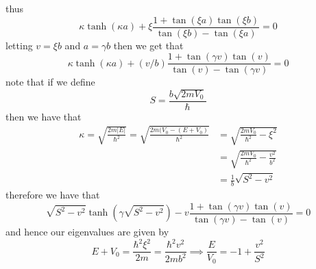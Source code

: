 \documentclass[12pt]{report}
\begin{document}
thus
\begin{equation*}
\kappa \tanh(\kappa a) + \xi \frac{1 + \tan(\xi a)\tan(\xi b)}{\tan(\xi b) - \tan(\xi a)} = 0
\end{equation*}
letting $v = \xi b$ and $a = \gamma b$ then we get that
\begin{equation*}
    \kappa \tanh(\kappa a) + (v/b) \frac{1 + \tan(\gamma v)\tan(v)}{\tan(v) - \tan(\gamma v)} = 0
\end{equation*}
note that if we define
\begin{equation*}
    S = \frac{b\sqrt{2mV_0}}{\hbar}
\end{equation*}
then we have that
\begin{align*}
    \kappa = \sqrt{\frac{2m|E|}{\hbar^2}} =\sqrt{\frac{2m(V_0 - (E + V_0)}{\hbar^2}} &= \sqrt{\frac{2mV_0}{\hbar^2} -\xi^2} \\
    &= \sqrt{\frac{2mV_0}{\hbar^2} -\frac{v^2}{b^2}} \\
    &= \frac{1}{b} \sqrt{S^2 - v^2}
\end{align*}
therefore we have that
\begin{equation*}
   \sqrt{S^2 - v^2} \tanh(\gamma \sqrt{S^2 - v^2}) - v \frac{1 + \tan(\gamma v)\tan(v)}{\tan(\gamma v) - \tan(v)} = 0
\end{equation*}
and hence our eigenvalues are given by
\begin{equation*}
    E + V_0 = \frac{\hbar^2 \xi^2}{2m} = \frac{\hbar^2 v^2}{2mb^2} \implies \frac{E}{V_0} = -1 + \frac{v^2}{S^2}
\end{equation*}
\end{document}
